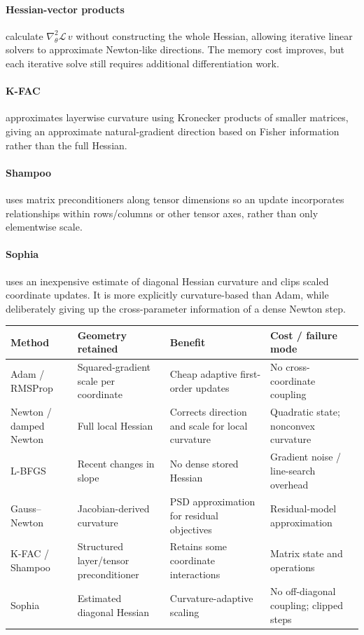 \paragraph{Hessian-vector products} calculate $\nabla_\theta^2\mathcal L\,v$ without constructing the whole Hessian, allowing iterative linear solvers to approximate Newton-like directions.
The memory cost improves, but each iterative solve still requires additional differentiation work.

\paragraph{K-FAC} approximates layerwise curvature using Kronecker products of smaller matrices, giving an approximate natural-gradient direction based on Fisher information rather than the full Hessian.
\paragraph{Shampoo} uses matrix preconditioners along tensor dimensions so an update incorporates relationships within rows/columns or other tensor axes, rather than only elementwise scale.

\paragraph{Sophia} uses an inexpensive estimate of diagonal Hessian curvature and clips scaled coordinate updates.
It is more explicitly curvature-based than Adam, while deliberately giving up the cross-parameter information of a dense Newton step.

\begin{center}
\small
\begin{tabularx}{.97\linewidth}{@{}L{.19\linewidth}L{.27\linewidth}YY@{}}
\toprule
\textbf{Method} & \textbf{Geometry retained} & \textbf{Benefit} & \textbf{Cost / failure mode} \\
\midrule
Adam / RMSProp & Squared-gradient scale per coordinate & Cheap adaptive first-order updates & No cross-coordinate coupling \\
Newton / damped Newton & Full local Hessian & Corrects direction and scale for local curvature & Quadratic state; nonconvex curvature \\
L-BFGS & Recent changes in slope & No dense stored Hessian & Gradient noise / line-search overhead \\
Gauss--Newton & Jacobian-derived curvature & PSD approximation for residual objectives & Residual-model approximation \\
K-FAC / Shampoo & Structured layer/tensor preconditioner & Retains some coordinate interactions & Matrix state and operations \\
Sophia & Estimated diagonal Hessian & Curvature-adaptive scaling & No off-diagonal coupling; clipped steps \\
\bottomrule
\end{tabularx}
\end{center}


